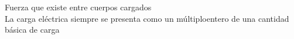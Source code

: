 \documentclass[preview]{standalone}
\begin{document}
Fuerza que existe entre cuerpos cargados\\La carga eléctrica siempre se presenta como
 un múltiploentero de una cantidad básica de carga\\
\end{document}
